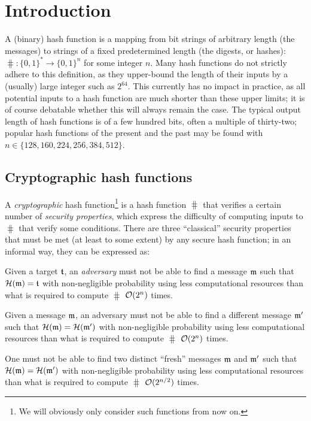 \section{Introduction}
\label{sec:intro}

A (binary) hash function is a mapping from bit strings of arbitrary length (the messages) to strings of a fixed predetermined length (the digests, or hashes):
$\hash : \{0,1\}^* \rightarrow \{0,1\}^n$ for some integer $n$.
Many hash functions do not strictly adhere to this definition, as they upper-bound the length of their inputs by a (usually) large integer such as $2^{64}$. This currently has
no impact in practice, as all potential inputs to a hash function are much shorter than these upper limits; it is of course debatable whether this will always remain the case. 
The typical output length of hash functions is of a few hundred bits, often a multiple of thirty-two; popular hash functions of the present and the past may be found with
$n \in \{128, 160, 224, 256, 384, 512\}$.

\subsection{Cryptographic hash functions}

A \emph{cryptographic} hash function\footnote{We will obviously only consider such functions from now on.} is a hash function $\hash$ that verifies a certain number of \emph{security properties}, which express the difficulty of computing inputs
to $\hash$ that verify some conditions. There are three ``classical'' security properties that must be met (at least to some extent)
by any secure hash function; in an informal way, they can be expressed as:
\begin{defi} Given a target $\mathfrak{t}$, an \emph{adversary} must not be able to find a message $\mathfrak{m}$ such that $\operatorname{\mathcal{H}}(\mathfrak{m}) = \mathfrak{t}$ with non-negligible probability using
less computational resources than what is required to compute $\hash$ $\operatorname{\mathcal{O}}(2^n)$ times.
\label{def:pre}
\end{defi}
\begin{defi} Given a message $\mathfrak{m}$, an adversary must not be able to find a different message $\mathfrak{m}'$ such that
$\operatorname{\mathcal{H}}(\mathfrak{m}) = \operatorname{\mathcal{H}}(\mathfrak{m}')$  with non-negligible probability using less computational resources than what is required to compute $\hash$ $\operatorname{\mathcal{O}}(2^n)$ times.
\label{def:2pre}
\end{defi}
\begin{defi} One must not be able to find two distinct ``fresh'' messages $\mathfrak{m}$ and $\mathfrak{m}'$ such that $\operatorname{\mathcal{H}}(\mathfrak{m}) =
\operatorname{\mathcal{H}}(\mathfrak{m}')$ with non-negligible probability using less computational resources than what is required to compute $\hash$ $\operatorname{\mathcal{O}}(2^{n/2})$ times.
\label{def:coll}
\end{defi}

